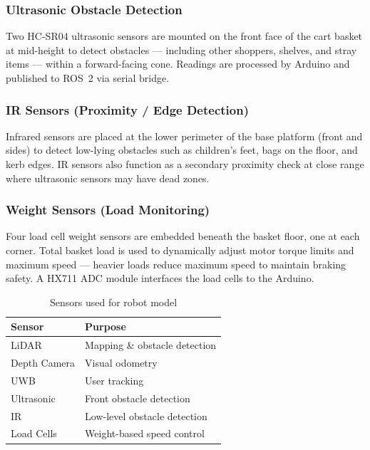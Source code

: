 \subsubsection{Ultrasonic Obstacle Detection}

Two HC-SR04 ultrasonic sensors are mounted on the front face of the cart
basket at mid-height to detect obstacles --- including other shoppers,
shelves, and stray items --- within a forward-facing cone. Readings are
processed by Arduino and published to ROS~2 via serial bridge.

\subsubsection{IR Sensors (Proximity / Edge Detection)}

Infrared sensors are placed at the lower perimeter of the base platform
(front and sides) to detect low-lying obstacles such as children's feet,
bags on the floor, and kerb edges. IR sensors also function as a secondary
proximity check at close range where ultrasonic sensors may have dead
zones.

\subsubsection{Weight Sensors (Load Monitoring)}

Four load cell weight sensors are embedded beneath the basket floor, one
at each corner. Total basket load is used to dynamically adjust motor
torque limits and maximum speed --- heavier loads reduce maximum speed to
maintain braking safety. A HX711 ADC module interfaces the load cells to
the Arduino.

\begin{table}[!ht]
\centering
\caption{Sensors used for robot model}
\begin{tabular}{|l|l|}
\hline
\textbf{Sensor} & \textbf{Purpose} \\ \hline
LiDAR & Mapping \& obstacle detection \\ \hline
Depth Camera & Visual odometry \\ \hline
UWB & User tracking \\ \hline
Ultrasonic & Front obstacle detection \\ \hline
IR & Low-level obstacle detection \\ \hline
Load Cells & Weight-based speed control \\ \hline
\end{tabular}
\end{table}


